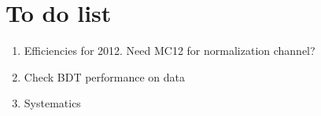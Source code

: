 
\setcounter{section}{-1}
\section{To do list}

\begin{enumerate}
	\item Efficiencies for 2012. Need MC12 for normalization channel?
	\item Check BDT performance on data
	\item Systematics
\end{enumerate}

\clearpage

